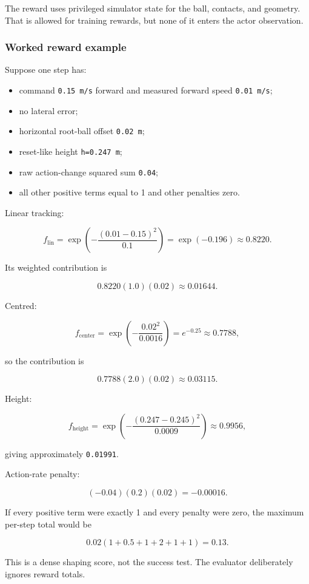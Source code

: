 \documentclass[
  american,
  11pt,
  letterpaper,
]{article}
\newcounter{none} %
\providecommand{\tightlist}{%
  \setlength{\itemsep}{0pt}\setlength{\parskip}{0pt}}
\begin{document}
The reward uses privileged simulator state for the ball, contacts, and
geometry. That is allowed for training rewards, but none of it enters
the actor observation.

\subsubsection{Worked reward example}\label{worked-reward-example}

Suppose one step has:

\begin{itemize}
\tightlist
\item
  command \texttt{0.15\ m/s} forward and measured forward speed
  \texttt{0.01\ m/s};
\item
  no lateral error;
\item
  horizontal root-ball offset \texttt{0.02\ m};
\item
  reset-like height \texttt{h=0.247\ m};
\item
  raw action-change squared sum \texttt{0.04};
\item
  all other positive terms equal to 1 and other penalties zero.
\end{itemize}

Linear tracking:

\[
f_{\text{lin}}
=\exp\left(-\frac{(0.01-0.15)^2}{0.1}\right)
=\exp(-0.196)
\approx0.8220.
\]

Its weighted contribution is

\[
0.8220(1.0)(0.02)\approx0.01644.
\]

Centred:

\[
f_{\text{center}}
=\exp\left(-\frac{0.02^2}{0.0016}\right)
=e^{-0.25}
\approx0.7788,
\]

so the contribution is

\[
0.7788(2.0)(0.02)\approx0.03115.
\]

Height:

\[
f_{\text{height}}
=\exp\left(-\frac{(0.247-0.245)^2}{0.0009}\right)
\approx0.9956,
\]

giving approximately \texttt{0.01991}.

Action-rate penalty:

\[
(-0.04)(0.2)(0.02)=-0.00016.
\]

If every positive term were exactly 1 and every penalty were zero, the
maximum per-step total would be

\[
0.02(1+0.5+1+2+1+1)=0.13.
\]

This is a dense shaping score, not the success test. The evaluator
deliberately ignores reward totals.
\end{document}
